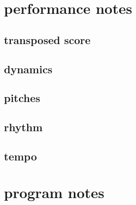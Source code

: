 \documentclass[12pt, lettersize]{book}
\begin{document}
\section{performance notes}
\subsection{transposed score}

\subsection{dynamics}

\subsection{pitches}

\subsection{rhythm}

\subsection{tempo}

\newpage
\section{program notes}

\end{document}
